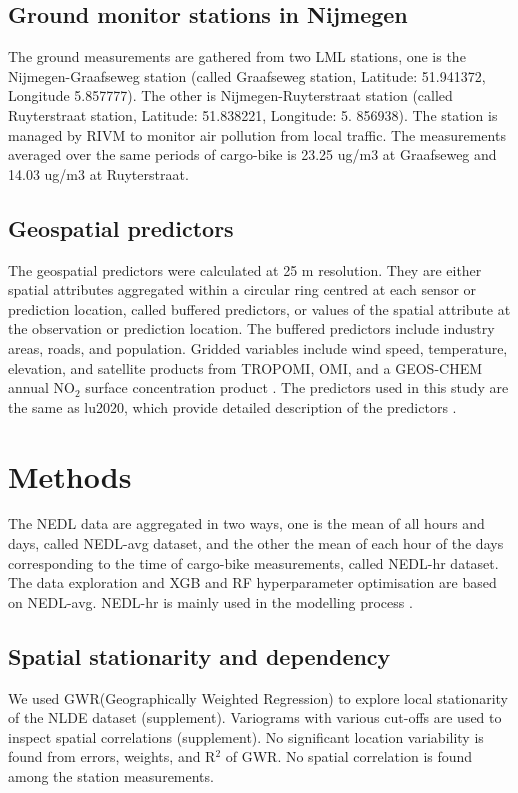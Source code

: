 \documentclass{article}
\begin{document}
\subsection{Ground monitor stations in Nijmegen}
The ground measurements are gathered from two LML stations, one is the Nijmegen-Graafseweg station (called Graafseweg station, Latitude: 51.941372, Longitude 5.857777). The other is Nijmegen-Ruyterstraat station (called Ruyterstraat station, Latitude: 51.838221, Longitude: 5. 856938). The station is managed by RIVM to monitor air pollution from local traffic. The measurements averaged over the same periods of cargo-bike is 23.25 ug/m3 at Graafseweg and 14.03 ug/m3 at Ruyterstraat.
 

 
\subsection{Geospatial predictors}
 The geospatial predictors were calculated at 25 m resolution. They are either spatial attributes aggregated within a circular ring centred at each sensor or prediction location, called buffered predictors, or values of the spatial attribute at the observation or prediction location. The buffered predictors include industry areas, roads, and population. Gridded variables include wind speed, temperature, elevation, and satellite products from TROPOMI, OMI, and a GEOS-CHEM \citep{bey2001global,GEOS-CHEM} annual NO$_2$ surface concentration product \citep{geddes2016long}. The predictors used in this study are the same as lu2020, which provide detailed description of the predictors . 
  

\section{Methods}
The NEDL data are aggregated in two ways, one is the mean of all hours and days, called NEDL-avg dataset, and the other the mean of each hour of the days corresponding to the time of cargo-bike measurements, called NEDL-hr dataset. The data exploration and XGB and RF hyperparameter optimisation are based on NEDL-avg. NEDL-hr is mainly used in the modelling process . 

\subsection{Spatial stationarity and dependency}
We used GWR(Geographically Weighted Regression) to explore local stationarity of the NLDE dataset (supplement). Variograms with various cut-offs are used to inspect spatial correlations (supplement). No significant location variability is found from errors, weights, and R$^2$ of GWR. No spatial correlation is found among the station measurements.     
\end{document}
